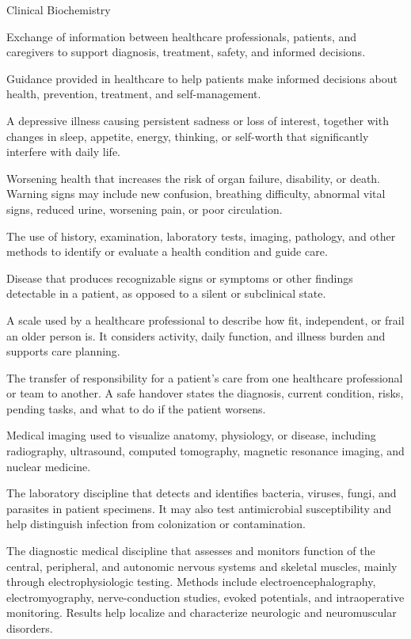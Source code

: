 \synonyms
Clinical Biochemistry

 Exchange of information between healthcare professionals, patients, and caregivers to
support diagnosis, treatment, safety, and informed decisions.

 Guidance provided in healthcare to help patients make informed decisions about health,
prevention, treatment, and self-management.

 A depressive illness causing persistent sadness or loss of interest, together with changes in sleep, appetite, energy, thinking, or self-worth that significantly interfere with daily life.

 Worsening health that increases the risk of organ failure, disability, or death. Warning signs may include new confusion, breathing difficulty, abnormal vital signs, reduced urine, worsening pain, or poor circulation.

 The use of history, examination, laboratory tests, imaging, pathology, and other methods to identify or evaluate a health condition and guide care.

 Disease that produces recognizable signs or symptoms or other findings detectable in a patient, as opposed to a silent or subclinical state.

 A scale used by a healthcare professional to describe how fit, independent, or frail an older person is. It considers activity, daily function, and illness burden and supports care planning.

 The transfer of responsibility for a patient's care from one healthcare professional or team to another. A safe handover states the diagnosis, current condition, risks, pending tasks, and what to do if the patient worsens.

 Medical imaging used to visualize anatomy, physiology, or disease, including radiography, ultrasound, computed tomography, magnetic resonance imaging, and nuclear medicine.

 The laboratory discipline that detects and identifies bacteria, viruses, fungi, and parasites in patient specimens. It may also test antimicrobial susceptibility and help distinguish infection from colonization or contamination.

 The diagnostic medical discipline that assesses and monitors function of the central, peripheral, and autonomic nervous systems and skeletal muscles, mainly through electrophysiologic testing.
Methods include electroencephalography, electromyography, nerve-conduction
studies, evoked potentials, and intraoperative monitoring. Results help
localize and characterize neurologic and neuromuscular disorders.

